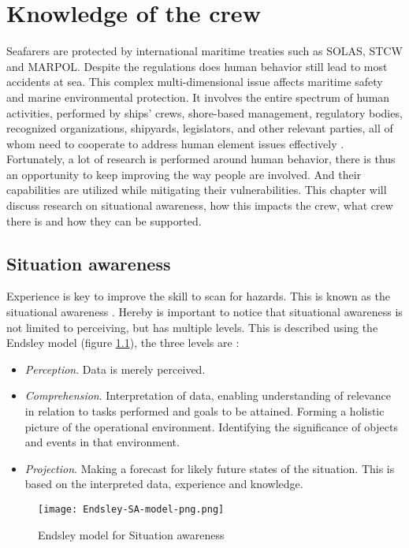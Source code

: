 \chapter{Knowledge of the crew}
\label{sec:knowledge}
Seafarers are protected by international maritime treaties such as \ac{SOLAS}, \ac{STCW} and \ac{MARPOL}. Despite the regulations does human behavior still lead to most accidents at sea. This complex multi-dimensional issue affects maritime safety and marine environmental protection. It involves the entire spectrum of human activities, performed by ships' crews, shore-based management, regulatory bodies, recognized organizations, shipyards, legislators, and other relevant parties, all of whom need to cooperate to address human element issues effectively \cite{IMO2017}.
Fortunately, a lot of research is performed around human behavior, there is thus an opportunity to keep improving the way people are involved. And their capabilities are utilized while mitigating their vulnerabilities.
This chapter will discuss research on situational awareness, how this impacts the crew, what crew there is and how they can be supported.

\section{Situation awareness}
Experience is key to improve the skill to scan for hazards. This is known as the situational awareness \cite{Underwood2013}. Hereby is important to notice that situational awareness is not limited to perceiving, but has multiple levels. This is described using the Endsley model (figure \ref{fig:Endsley-SA-model}), the three levels are \cite{Kalloniatis2017}: 
\begin{itemize}
	\item \emph{Perception}. Data is merely perceived.
	\item \emph{Comprehension}. Interpretation of data, enabling understanding of relevance in relation to tasks performed and goals to be attained. Forming a holistic picture of the operational environment. Identifying the significance of objects and events in that environment.
	\item \emph{Projection}. Making a forecast for likely future states of the situation. This is based on the interpreted data, experience and knowledge.
\end{itemize}

\begin{figure}[H]
	\centering
	\texttt{[image: Endsley-SA-model-png.png]}
	\caption{Endsley model for Situation awareness}
	\label{fig:Endsley-SA-model}
\end{figure}

